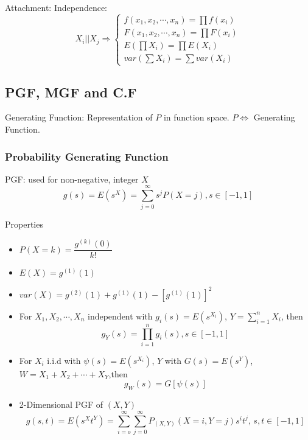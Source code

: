 Attachment: Independence:\begin{equation}    X_i || X_j\Rightarrow \begin{cases}
        f(x_1,x_2,\cdots,x_n)=\prod f(x_i)\\
        F(x_1,x_2,\cdots,x_n)=\prod F(x_i)\\
        E(\prod X_i)=\prod E(X_i)\\
        var(\sum X_i)=\sum var(X_i)
    \end{cases}
\end{equation}


\subsection{PGF, MGF and C.F}\label{SectionPGFMGFCF}

    Generating Function: Representation of $P$ in function space. $P\Leftrightarrow$ Generating Function.

\subsubsection{Probability Generating Function}
    PGF: used for non-negative, integer $X$
    \begin{equation}
        g(s)=E(s^X)=\sum_{j=0}^\infty s^jP(X=j)    ,s\in[-1,1]
    \end{equation}

    Properties
    \begin{itemize}
        \item $P(X=k)=\dfrac{g^{(k)}(0)}{k!}$
        \item $E(X)=g^{(1)}(1)$
        \item $var(X)=g^{(2)}(1)+g^{(1)}(1)-[g^{(1)}(1)]^2 $
        \item For $X_1,X_2,\cdots,X_n$ independent with $g_i(s)=E(s^{X_i})$, $Y={\displaystyle \sum_{i=1}^n} X_i$, then
        \begin{equation}    
            g_Y(s)=\prod_{i=1}^n g_i(s),s\in[-1,1]
        \end{equation}
        \item For ${X_i}$ i.i.d with $\psi(s)=E(s^{X_i})$, $Y$ with $G(s)=E(s^{Y})$, $W=X_1+X_2+\cdots +X_Y$,then
        \begin{equation}    
            g_W(s)=G[\psi(s)]    
        \end{equation}
        \item 2-Dimensional PGF of $(X,Y)$
        \begin{equation}    
            g(s,t)=E(s^Xt^Y)=\sum_{i=o}^\infty\sum_{j=0}^\infty P_{(X,Y)}(X=i,Y=j)s^it^j,\, s,t\in[-1,1]
        \end{equation}
    \end{itemize}
